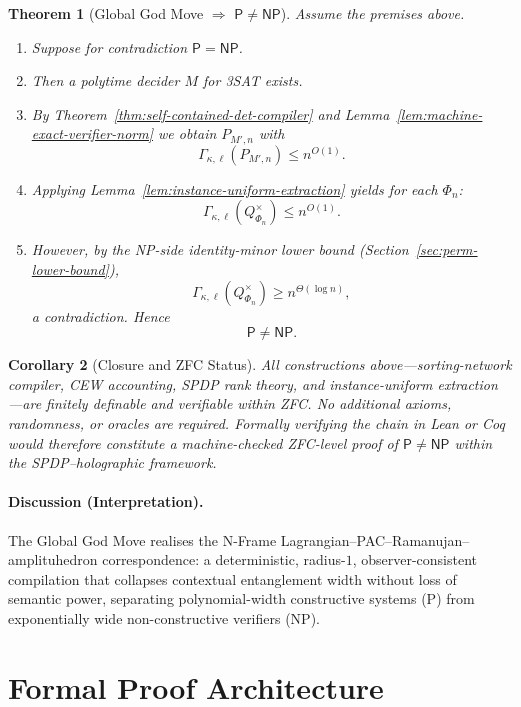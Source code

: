 \documentclass[12pt]{article}
\newtheorem{theorem}{Theorem}
\newtheorem{corollary}[theorem]{Corollary}
\theoremstyle{definition}
\theoremstyle{definition}
\theoremstyle{remark}
\theoremstyle{remark}
\begin{document}
\begin{theorem}[Global God Move $\Rightarrow$ $\mathsf{P} \neq \mathsf{NP}$]\label{thm:global-god-move-pnp}
Assume the premises above.
\begin{enumerate}
\item Suppose for contradiction $\mathsf{P} = \mathsf{NP}$.
\item Then a polytime decider $M$ for 3SAT exists.
\item By Theorem~\ref{thm:self-contained-det-compiler} and Lemma~\ref{lem:machine-exact-verifier-norm} we obtain $P_{M',n}$ with
\[
\Gamma_{\kappa,\ell}(P_{M',n}) \leq n^{O(1)}.
\]
\item Applying Lemma~\ref{lem:instance-uniform-extraction} yields for each $\Phi_n$:
\[
\Gamma_{\kappa,\ell}(Q^{\times}_{\Phi_n}) \leq n^{O(1)}.
\]
\item However, by the NP-side identity-minor lower bound (Section~\ref{sec:perm-lower-bound}),
\[
\Gamma_{\kappa,\ell}(Q^{\times}_{\Phi_n}) \geq n^{\Theta(\log n)},
\]
a contradiction. Hence
\[
\boxed{\mathsf{P} \neq \mathsf{NP}.}
\]
\end{enumerate}
\end{theorem}

\begin{corollary}[Closure and ZFC Status]\label{cor:zfc-status}
All constructions above---sorting-network compiler, CEW accounting, SPDP rank theory, and instance-uniform extraction---are finitely definable and verifiable within ZFC.
No additional axioms, randomness, or oracles are required.
Formally verifying the chain in Lean or Coq would therefore constitute a machine-checked ZFC-level proof of $\mathsf{P} \neq \mathsf{NP}$ within the SPDP--holographic framework.
\end{corollary}

\paragraph{Discussion (Interpretation).}
The Global God Move realises the N-Frame Lagrangian--PAC--Ramanujan--amplituhedron correspondence:
a deterministic, radius-$1$, observer-consistent compilation that collapses contextual entanglement width without loss of semantic power, separating polynomial-width constructive systems (P) from exponentially wide non-constructive verifiers (NP).


\section{Formal Proof Architecture}
\label{sec:formal-proof-architecture}
\end{document}
